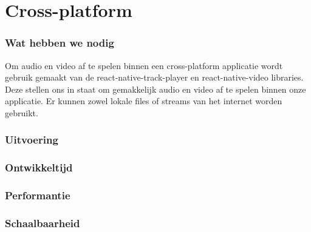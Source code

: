 \section{Cross-platform}
\subsubsection{Wat hebben we nodig}
Om audio en video af te spelen binnen een cross-platform applicatie wordt gebruik gemaakt van de
react-native-track-player en react-native-video libraries. Deze stellen ons in staat om gemakkelijk 
audio en video af te spelen binnen onze applicatie. Er kunnen zowel lokale files of streams van 
het internet worden gebruikt.

\subsubsection{Uitvoering}



\subsubsection{Ontwikkeltijd}



\subsubsection{Performantie}



\subsubsection{Schaalbaarheid}




